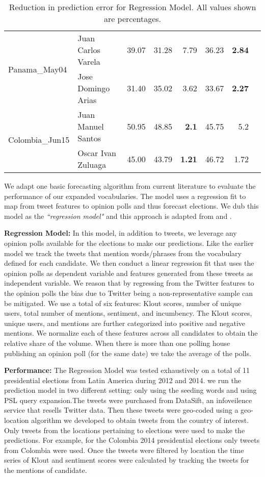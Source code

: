 \begin{table*}[ht]
\begin{tabular}{| l | l | r | r | r | r | r | r |}
		\hline
		\multirow{2}{*}{Panama\_May04} & Juan Carlos Varela & 39.07 &31.28  & 7.79 & 36.23  & \textbf{2.84}\\\cline{2-7}
																	& Jose Domingo Arias  & 31.40 & 35.02  & 3.62  & 33.67  & \textbf{2.27} \\
		\hline 											 
		\multirow{2}{*}{Colombia\_Jun15} & Juan Manuel Santos & 50.95 &48.85  & \textbf{2.1} & 45.75 & 5.2\\\cline{2-7}
																	& Oscar Ivan Zuluaga & 45.00 & 43.79 & \textbf{1.21} & 46.72  & 1.72 \\
		\hline
		\end{tabular}
		\caption{Reduction in prediction error for Regression Model. All values shown are percentages.}
		\label{table:trackRecord}
	\end{table*}	

We adapt one basic forecasting algorithm from current literature to evaluate the
performance of our expanded vocabularies. The model uses a regression fit to map from tweet features to opinion polls and thus forecast elections. We dub this model as the \emph{``regression model"} and this approach is adapted from \cite{bermingham2011using} and \cite{o2010tweets}.

{\bf Regression Model:}
In this model, in addition to tweets, we leverage any opinion polls available for the elections 
to make our predictions.
Like the earlier model we track the tweets that mention words/phrases
from the vocabulary defined for each candidate.
We then conduct a linear regression fit that uses the opinion polls as dependent variable and features generated from 
these tweets as independent variable.
We reason that by regressing from the Twitter features to the opinion polls the bias due to Twitter being a non-representative sample
can be mitigated.
We use a total of six features: Klout scores, number of unique users, total number of mentions, sentiment, and incumbency.
The Klout scores, unique users, and mentions are further categorized into positive and negative mentions.
We normalize each of these features across all candidates to obtain the relative share of the volume. 
When there is more than one polling house publishing an opinion poll (for the same date) we take the average of the polls. 

\noindent
{\bf Performance:}
The Regression Model was tested exhaustively on a total of 11 presidential elections from Latin America during 2012 and 2014. we run the prediction model in two different setting: only using the seeding words and using PSL query expansion.The tweets were purchased from DataSift, an infoveilence service that resells Twitter data. Then these tweets were geo-coded using a geo-location algorithm we developed to obtain tweets from the country of interest.
Only tweets from the locations pertaining to elections were used to make the predictions.
For example, for the Colombia 2014 presidential elections only tweets from Colombia were used.
Once the tweets were filtered by location the time series of Klout and sentiment scores were calculated by tracking the tweets for the mentions of candidate.

